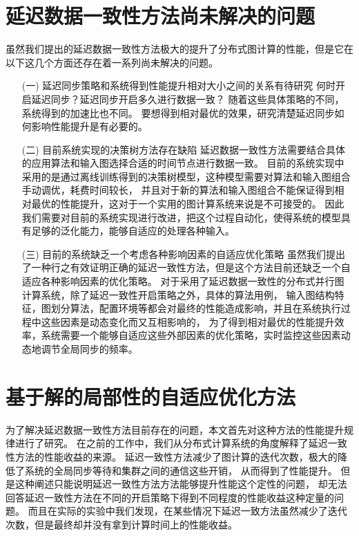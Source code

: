 \section{延迟数据一致性方法尚未解决的问题}
虽然我们提出的延迟数据一致性方法极大的提升了分布式图计算的性能，但是它在以下这几个方面还存在着一系列尚未解决的问题。    
\begin{enumerate}      
  \item[(一)] 延迟同步策略和系统得到性能提升相对大小之间的关系有待研究 \newline\indent
    何时开启延迟同步？延迟同步开启多久进行数据一致？
    随着这些具体策略的不同，系统得到的加速比也不同。
    要想得到相对最优的效果，研究清楚延迟同步如何影响性能提升是有必要的。

  \item[(二)] 目前系统实现的决策树方法存在缺陷 \newline\indent
    延迟数据一致性方法需要结合具体的应用算法和输入图选择合适的时间节点进行数据一致。
    目前的系统实现中采用的是通过离线训练得到的决策树模型，这种模型需要对算法和输入图组合手动调优，耗费时间较长，
    并且对于新的算法和输入图组合不能保证得到相对最优的性能提升，这对于一个实用的图计算系统来说是不可接受的。
    因此我们需要对目前的系统实现进行改进，把这个过程自动化，使得系统的模型具有足够的泛化能力，能够自适应的处理各种输入。          

  \item[(三)] 目前的系统缺乏一个考虑各种影响因素的自适应优化策略 \newline\indent
    虽然我们提出了一种行之有效证明正确的延迟一致性方法，但是这个方法目前还缺乏一个自适应各种影响因素的优化策略。
    对于采用了延迟数据一致性的分布式并行图计算系统，除了延迟一致性开启策略之外，具体的算法用例，
    输入图结构特征，图划分算法，配置环境等都会对最终的性能造成影响，并且在系统执行过程中这些因素是动态变化而又互相影响的，
    为了得到相对最优的性能提升效率，系统需要一个能够自适应这些外部因素的优化策略，实时监控这些因素动态地调节全局同步的频率。          
\end{enumerate}
\section{基于解的局部性的自适应优化方法}
为了解决延迟数据一致性方法目前存在的问题，本文首先对这种方法的性能提升规律进行了研究。
在之前的工作中，我们从分布式计算系统的角度解释了延迟一致性方法的性能收益的来源。
延迟一致性方法减少了图计算的迭代次数，极大的降低了系统的全局同步等待和集群之间的通信这些开销，
从而得到了性能提升。
但是这种阐述只能说明延迟一致性方法方法能够提升性能这个定性的问题，
却无法回答延迟一致性方法在不同的开启策略下得到不同程度的性能收益这种定量的问题。
而且在实际的实验中我们发现，在某些情况下延迟一致方法虽然减少了迭代次数，但是最终却并没有拿到计算时间上的性能收益。

